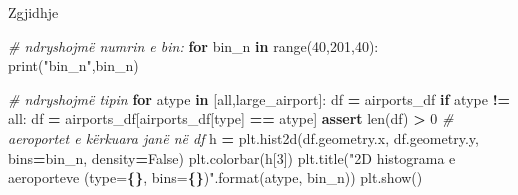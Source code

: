 \documentclass[
  ignorenonframetext,
]{beamer}
\newenvironment{Shaded}{\begin{snugshade}}{\end{snugshade}}
\newcommand{\BuiltInTok}[1]{#1}
\newcommand{\CommentTok}[1]{\textcolor[rgb]{0.56,0.35,0.01}{\textit{#1}}}
\newcommand{\ControlFlowTok}[1]{\textcolor[rgb]{0.13,0.29,0.53}{\textbf{#1}}}
\newcommand{\DecValTok}[1]{\textcolor[rgb]{0.00,0.00,0.81}{#1}}
\newcommand{\KeywordTok}[1]{\textcolor[rgb]{0.13,0.29,0.53}{\textbf{#1}}}
\newcommand{\NormalTok}[1]{#1}
\newcommand{\OperatorTok}[1]{\textcolor[rgb]{0.81,0.36,0.00}{\textbf{#1}}}
\newcommand{\SpecialCharTok}[1]{\textcolor[rgb]{0.81,0.36,0.00}{\textbf{#1}}}
\newcommand{\StringTok}[1]{\textcolor[rgb]{0.31,0.60,0.02}{#1}}
\newcommand{\VariableTok}[1]{\textcolor[rgb]{0.00,0.00,0.00}{#1}}
\begin{document}
\begin{frame}[fragile]{Zgjidhje}
\protect\hypertarget{zgjidhje-22}{}

\begin{Shaded}
\begin{Highlighting}[]
\CommentTok{\# ndryshojmë numrin e bin:}
\ControlFlowTok{for}\NormalTok{ bin\_n }\KeywordTok{in} \BuiltInTok{range}\NormalTok{(}\DecValTok{40}\NormalTok{,}\DecValTok{201}\NormalTok{,}\DecValTok{40}\NormalTok{):}
    \BuiltInTok{print}\NormalTok{(}\StringTok{"bin\_n"}\NormalTok{,bin\_n)}
    
    \CommentTok{\# ndryshojmë tipin}
    \ControlFlowTok{for}\NormalTok{ atype }\KeywordTok{in}\NormalTok{ [}\StringTok{\textquotesingle{}all\textquotesingle{}}\NormalTok{,}\StringTok{\textquotesingle{}large\_airport\textquotesingle{}}\NormalTok{]:}
\NormalTok{        df }\OperatorTok{=}\NormalTok{ airports\_df}
        \ControlFlowTok{if}\NormalTok{ atype }\OperatorTok{!=} \StringTok{\textquotesingle{}all\textquotesingle{}}\NormalTok{:}
\NormalTok{            df }\OperatorTok{=}\NormalTok{ airports\_df[airports\_df[}\StringTok{\textquotesingle{}type\textquotesingle{}}\NormalTok{] }\OperatorTok{==}\NormalTok{ atype]}
        \ControlFlowTok{assert} \BuiltInTok{len}\NormalTok{(df) }\OperatorTok{\textgreater{}} \DecValTok{0}
        \CommentTok{\# aeroportet e kërkuara janë në df}
\NormalTok{        h }\OperatorTok{=}\NormalTok{ plt.hist2d(df.geometry.x, df.geometry.y, bins}\OperatorTok{=}\NormalTok{bin\_n, density}\OperatorTok{=}\VariableTok{False}\NormalTok{)}
\NormalTok{        plt.colorbar(h[}\DecValTok{3}\NormalTok{])}
\NormalTok{        plt.title(}\StringTok{"2D histograma e aeroporteve (type=}\SpecialCharTok{\{\}}\StringTok{, bins=}\SpecialCharTok{\{\}}\StringTok{)"}\NormalTok{.}\BuiltInTok{format}\NormalTok{(atype, bin\_n))}
\NormalTok{        plt.show()}
\end{Highlighting}
\end{Shaded}
\end{frame}
\end{document}

